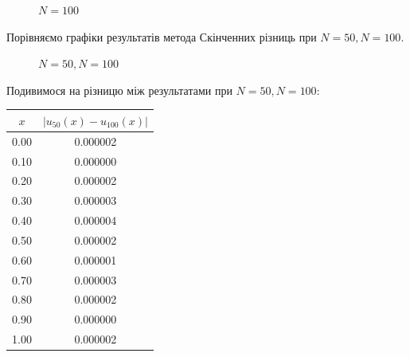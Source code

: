 \documentclass[14pt,a4paper]{scrartcl}
\begin{document}
\begin{figure}[h]
\begin{center}
\begin{minipage}[h]{0.45\linewidth}
				\caption{$N = 100$}
				\label{ris:experimcoded}
			\end{minipage}
		\end{center}
	\end{figure}
	
	Порівняємо графіки результатів метода Скінченних різниць при $N= 50, N = 100$.
	
	\begin{figure}[h!]
		\caption{$N=50,N=100$}
		\label{fig:image}
	\end{figure}



	Подивимося на різницю між результатами при $N=50, N=100$:
	
	\begin{center}
		\begin{tabular}{ | c | c | }
			\hline
			$x$ & $|u_{50}(x)-u_{100}(x)|$\\ \hline
			0.00 & 0.000002 \\
			0.10 & 0.000000 \\
			0.20 & 0.000002 \\
			0.30 & 0.000003 \\
			0.40 & 0.000004 \\
			0.50 & 0.000002 \\
			0.60 & 0.000001 \\
			0.70 & 0.000003 \\
			0.80 & 0.000002 \\
			0.90 & 0.000000 \\
			1.00 & 0.000002 \\
			\hline
		\end{tabular}
	\end{center}
\end{document}

